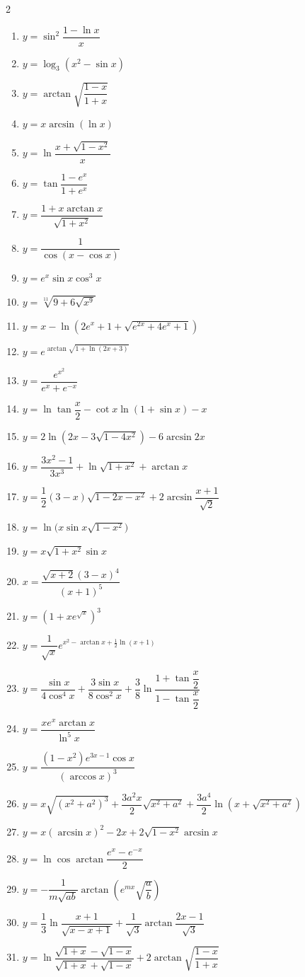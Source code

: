 \begin{multicols}{2}
\begin{enumerate}
  \item $y = \sin^2\dfrac{1 - \ln x}{x}$
  \item $y = \log_3(x^2 - \sin x)$
  \item $y = \arctan\sqrt{\dfrac{1 - x}{1 + x}}$
  \item $y = x\arcsin(\ln x)$
  \item $y = \ln\dfrac{x + \sqrt{1 - x^2}}{x}$
  \item $y = \tan\dfrac{1 - e^x}{1 + e^x}$
\item $y = \dfrac{1 + x \arctan x}{\sqrt{1 + x^2}}$
  \item $y = \dfrac{1}{\cos(x - \cos x)}$
  \item $y = e^x \sin x \cos^3 x$
  \item $y = \sqrt[11]{9 + 6\sqrt{x^9}}$
  \item $y = x - \ln\!\left(2e^x + 1 + \sqrt{e^{2x} + 4e^x + 1}\right)$
  \item $y = e^{\arctan\sqrt{1 + \ln(2x + 3)}}$
  \item $y = \dfrac{e^{x^2}}{e^x + e^{-x}}$
  \item $y = \ln\tan\dfrac{x}{2} - \cot x \ln(1 + \sin x) - x$
  \item $y = 2\ln\!\left(2x - 3\sqrt{1 - 4x^2}\right) - 6\arcsin 2x$
  \item $y = \dfrac{3x^2 - 1}{3x^3} + \ln\sqrt{1 + x^2} + \arctan x$
  \item $y = \dfrac{1}{2}(3 - x)\sqrt{1 - 2x - x^2} + 2\arcsin\dfrac{x + 1}{\sqrt{2}}$
  \item $y = \ln\!\big(x\sin x\sqrt{1 - x^2}\big)$
  \item $y = x\sqrt{1 + x^2}\sin x$
  \item $x = \dfrac{\sqrt{x + 2}(3 - x)^4}{(x + 1)^5}$
  \item $y = \left(1 + x e^{\sqrt{x}}\right)^3$
  \item $y = \dfrac{1}{\sqrt{x}}e^{x^2 - \arctan x + \frac{1}{2}\ln(x + 1)}$
  \item $y = \dfrac{\sin x}{4\cos^4 x} + \dfrac{3\sin x}{8\cos^2 x} + \dfrac{3}{8}\ln\dfrac{1 + \tan\dfrac{x}{2}}{1 - \tan\dfrac{x}{2}}$
  \item $y = \dfrac{x e^x \arctan x}{\ln^5 x}$
  \item $y = \dfrac{(1 - x^2)e^{3x - 1}\cos x}{(\arccos x)^3}$
  \item $y = x\sqrt{(x^2 + a^2)^3} + \dfrac{3a^2 x}{2}\sqrt{x^2 + a^2} + \dfrac{3a^4}{2}\ln\!\left(x + \sqrt{x^2 + a^2}\right)$
  \item $y = x(\arcsin x)^2 - 2x + 2\sqrt{1 - x^2}\arcsin x$
  \item $y = \ln\cos\arctan\dfrac{e^x - e^{-x}}{2}$
  \item $y = -\dfrac{1}{m\sqrt{ab}}\arctan\!\left(e^{mx}\sqrt{\dfrac{a}{b}}\right)$
  \item $y = \dfrac{1}{3}\ln\dfrac{x + 1}{\sqrt{x - x + 1}} + \dfrac{1}{\sqrt{3}}\arctan\dfrac{2x - 1}{\sqrt{3}}$
  \item $y = \ln\dfrac{\sqrt{1 + x} - \sqrt{1 - x}}{\sqrt{1 + x} + \sqrt{1 - x}} + 2\arctan\sqrt{\dfrac{1 - x}{1 + x}}$
\end{enumerate}
\end{multicols}
\newpage
